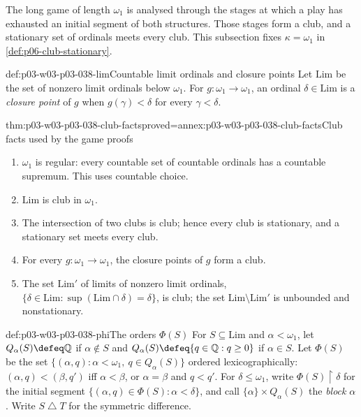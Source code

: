 The long game of length \(\omega_1\) is analysed through the stages at
which a play has exhausted an initial segment of both structures. Those
stages form a club, and a stationary set of ordinals meets every club. This
subsection fixes \(\kappa=\omega_1\) in \cref{def:p06-club-stationary}.

\begin{hbdefinition}{def:p03-w03-p03-038-lim}{Countable limit ordinals and closure points}
Let \(\mathrm{Lim}\) be the set of nonzero limit ordinals below
\(\omega_1\). For \(g:\omega_1\to\omega_1\), an ordinal
\(\delta\in\mathrm{Lim}\) is a \emph{closure point} of \(g\) when
\(g(\gamma)<\delta\) for every \(\gamma<\delta\).
\end{hbdefinition}

\begin{hblemma}{thm:p03-w03-p03-038-club-facts}{proved=annex:p03-w03-p03-038-club-facts}{Club facts used by the game proofs}
\begin{enumerate}
\item \(\omega_1\) is regular: every countable set of countable ordinals
      has a countable supremum. This uses countable choice.
\item \(\mathrm{Lim}\) is club in \(\omega_1\).
\item The intersection of two clubs is club; hence every club is
      stationary, and a stationary set meets every club.
\item For every \(g:\omega_1\to\omega_1\), the closure points of \(g\)
      form a club.
\item The set \(\mathrm{Lim}'\) of limits of nonzero limit ordinals,
      \(\{\delta\in\mathrm{Lim}:\sup(\mathrm{Lim}\cap\delta)=\delta\}\), is
      club; the set \(\mathrm{Lim}\setminus\mathrm{Lim}'\) is unbounded and
      nonstationary.
\end{enumerate}
\end{hblemma}

\begin{hbdefinition}{def:p03-w03-p03-038-phi}{The orders \(\Phi(S)\)}
For \(S\subseteq\mathrm{Lim}\) and \(\alpha<\omega_1\), let
\(Q_\alpha(S)\defeq\mathbb Q\) if \(\alpha\notin S\) and
\(Q_\alpha(S)\defeq\{q\in\mathbb Q:q\ge0\}\) if \(\alpha\in S\). Let
\(\Phi(S)\) be the set \(\{(\alpha,q):\alpha<\omega_1,\ q\in Q_\alpha(S)\}\)
ordered lexicographically: \((\alpha,q)<(\beta,q')\) iff \(\alpha<\beta\),
or \(\alpha=\beta\) and \(q<q'\). For \(\delta\le\omega_1\), write
\(\Phi(S)\mathbin{\upharpoonright}\delta\) for the initial segment
\(\{(\alpha,q)\in\Phi(S):\alpha<\delta\}\), and call
\(\{\alpha\}\times Q_\alpha(S)\) the \emph{block} \(\alpha\). Write
\(S\mathbin{\triangle}T\) for the symmetric difference.
\end{hbdefinition}

